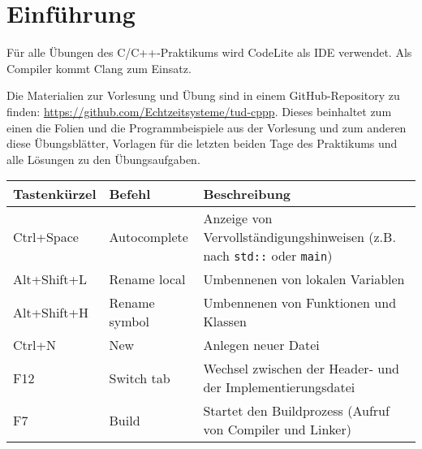 
\section*{Einführung}
Für alle Übungen des C/C++-Praktikums wird CodeLite als IDE verwendet. Als Compiler kommt Clang zum Einsatz.

Die Materialien zur Vorlesung und Übung sind in einem GitHub-Repository zu finden: \url{https://github.com/Echtzeitsysteme/tud-cppp}.
Dieses beinhaltet zum einen die Folien und die Programmbeispiele aus der Vorlesung und zum anderen diese Übungsblätter, Vorlagen für die letzten beiden Tage des Praktikums und alle Lösungen zu den Übungsaufgaben.



\begin{tabular}{l|l|p{11.5cm}}
    \toprule
    \textbf{Tastenkürzel} & \textbf{Befehl} & \textbf{Beschreibung}\\
    \midrule
	Ctrl+Space & Autocomplete &
	Anzeige von Vervollständigungshinweisen (z.B. nach \texttt{std::} oder \texttt{main})
	\\
	Alt+Shift+L & Rename local &
	Umbennenen von lokalen Variablen
	\\
	Alt+Shift+H & Rename symbol &
	Umbennenen von Funktionen und Klassen
	\\
	Ctrl+N & New &
	Anlegen neuer Datei
	\\
	F12 & Switch tab &
	Wechsel zwischen der Header- und der Implementierungsdatei
	\\
	F7 & Build &
	Startet den Buildprozess (Aufruf von Compiler und Linker)
    \\\bottomrule
\end{tabular}
